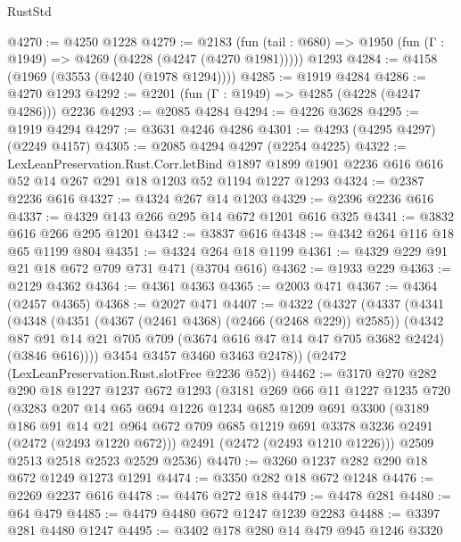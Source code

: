 \begin{lexlean}{RustStd}
\begin{coremodule}
@4270 := @4250 @1228
@4279 := @2183
    (fun (tail : @680) => @1950 (fun (Γ : @1949) => @4269 (@4228 (@4247 (@4270 @1981)))))
    @1293
@4284 := @4158 (@1969 (@3553 (@4240 (@1978 @1294))))
@4285 := @1919 @4284
@4286 := @4270 @1293
@4292 := @2201 (fun (Γ : @1949) => @4285 (@4228 (@4247 @4286))) @2236
@4293 := @2085 @4284
@4294 := @4226 @3628
@4295 := @1919 @4294
@4297 := @3631 @4246 @4286
@4301 := @4293 (@4295 @4297) (@2249 @4157)
@4305 := @2085 @4294 @4297 (@2254 @4225)
@4322 := LexLeanPreservation.Rust.Corr.letBind
    @1897
    @1899
    @1901
    @2236
    @616
    @616
    @52
    @14
    @267
    @291
    @18
    @1203
    @52
    @1194
    @1227
    @1293
@4324 := @2387 @2236 @616
@4327 := @4324 @267 @14 @1203
@4329 := @2396 @2236 @616
@4337 := @4329 @143 @266 @295 @14 @672 @1201 @616 @325
@4341 := @3832 @616 @266 @295 @1201
@4342 := @3837 @616
@4348 := @4342 @264 @116 @18 @65 @1199 @804
@4351 := @4324 @264 @18 @1199
@4361 := @4329 @229 @91 @21 @18 @672 @709 @731 @471 (@3704 @616)
@4362 := @1933 @229
@4363 := @2129 @4362
@4364 := @4361 @4363
@4365 := @2003 @471
@4367 := @4364 (@2457 @4365)
@4368 := @2027 @471
@4407 := @4322
    (@4327
      (@4337
        (@4341
          (@4348
            (@4351 (@4367 (@2461 @4368) (@2466 (@2468 @229)) @2585))
            (@4342
              @87
              @91
              @14
              @21
              @705
              @709
              (@3674 @616 @47 @14 @47 @705 @3682 @2424)
              (@3846 @616))))
        @3454
        @3457
        @3460
        @3463
        @2478))
    (@2472 (LexLeanPreservation.Rust.slotFree @2236 @52))
@4462 := @3170
    @270
    @282
    @290
    @18
    @1227
    @1237
    @672
    @1293
    (@3181
      @269
      @66
      @11
      @1227
      @1235
      @720
      (@3283
        @207
        @14
        @65
        @694
        @1226
        @1234
        @685
        @1209
        @691
        @3300
        (@3189
          @186
          @91
          @14
          @21
          @964
          @672
          @709
          @685
          @1219
          @691
          @3378
          @3236
          @2491
          (@2472 (@2493 @1220 @672)))
        @2491
        (@2472 (@2493 @1210 @1226)))
      @2509
      @2513
      @2518
      @2523
      @2529
      @2536)
@4470 := @3260 @1237 @282 @290 @18 @672 @1249 @1273 @1291
@4474 := @3350 @282 @18 @672 @1248
@4476 := @2269 @2237 @616
@4478 := @4476 @272 @18
@4479 := @4478 @281
@4480 := @64 @479
@4485 := @4479 @4480 @672 @1247 @1239 @2283
@4488 := @3397 @281 @4480 @1247
@4495 := @3402 @178 @280 @14 @479 @945 @1246 @3320

\end{coremodule}
\end{lexlean}
